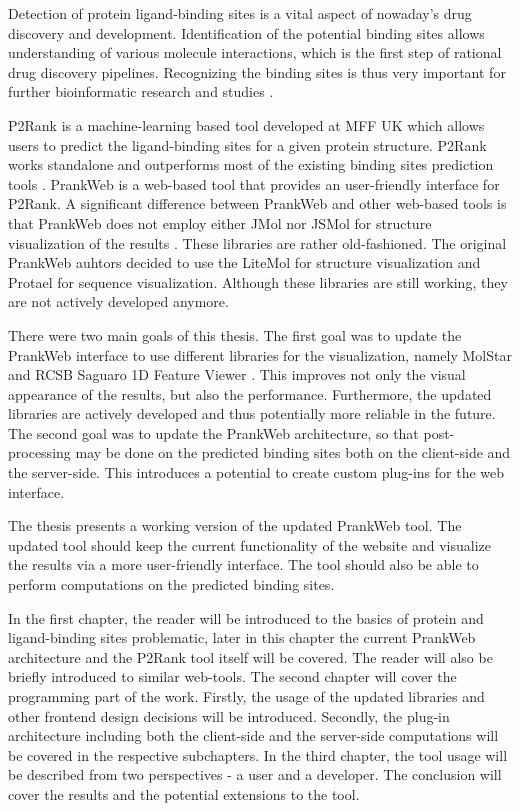 

Detection of protein ligand-binding sites is a vital aspect of nowaday's drug discovery and development. Identification of the potential binding sites allows understanding of various molecule interactions, which is the first step of rational drug discovery pipelines. Recognizing the binding sites is thus very important for further bioinformatic research and studies \cite{10.1093/bioinformatics/btt447}.

P2Rank is a machine-learning based tool developed at MFF UK which allows users to predict the ligand-binding sites for a given protein structure. P2Rank works standalone and outperforms most of the existing binding sites prediction tools \cite{krivak2018p2rank}. PrankWeb is a web-based tool that provides an user-friendly interface for P2Rank. A significant difference between PrankWeb and other web-based tools is that PrankWeb does not employ either JMol nor JSMol for structure visualization of the results \cite{jendele2019prankweb}. These libraries are rather old-fashioned. The original PrankWeb auhtors decided to use the LiteMol for structure visualization and Protael for sequence visualization. Although these libraries are still working, they are not actively developed anymore.

There were two main goals of this thesis. The first goal was to update the PrankWeb interface to use different libraries for the visualization, namely MolStar \cite{10.1093/nar/gkab314} and RCSB Saguaro 1D Feature Viewer \cite{10.1093/bioinformatics/btaa1012}. This improves not only the visual appearance of the results, but also the performance. Furthermore, the updated libraries are actively developed and thus potentially more reliable in the future. The second goal was to update the PrankWeb architecture, so that post-processing may be done on the predicted binding sites both on the client-side and the server-side. This introduces a potential to create custom plug-ins for the web interface.

The thesis presents a working version of the updated PrankWeb tool. The updated tool should keep the current functionality of the website and visualize the results via a more user-friendly interface. The tool should also be able to perform computations on the predicted binding sites.

In the first chapter, the reader will be introduced to the basics of protein and ligand-binding sites problematic, later in this chapter the current PrankWeb architecture and the P2Rank tool itself will be covered. The reader will also be briefly introduced to similar web-tools. The second chapter will cover the programming part of the work. Firstly, the usage of the updated libraries and other frontend design decisions will be introduced. Secondly, the plug-in architecture including both the client-side and the server-side computations will be covered in the respective subchapters. In the third chapter, the tool usage will be described from two perspectives - a user and a developer. The conclusion will cover the results and the potential extensions to the tool.
